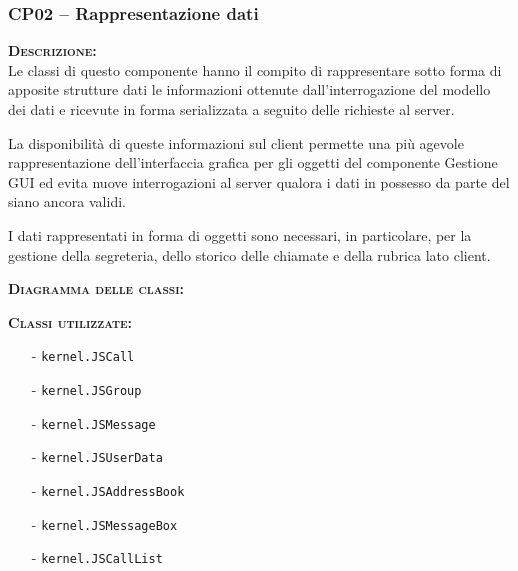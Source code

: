 \subsubsection{CP02 -- Rappresentazione dati}
\begin{description}
  \item{\scshape\bfseries Descrizione:}\\
Le classi di questo componente hanno il compito di rappresentare sotto forma di apposite strutture dati le informazioni ottenute dall'interrogazione del modello dei dati e ricevute in forma serializzata a seguito delle richieste al server.

La disponibilità di queste informazioni sul client permette una più agevole rappresentazione dell'interfaccia grafica per gli oggetti del componente \textsf{Gestione GUI} ed evita nuove interrogazioni al server qualora i dati in possesso da parte del  siano ancora validi.

I dati rappresentati in forma di oggetti sono necessari, in particolare, per la gestione della segreteria, dello storico delle chiamate e della rubrica lato client.

  \item{\scshape\bfseries Diagramma delle classi:}\\

	\item{\scshape\bfseries Classi utilizzate:} 
	\begin{itemize}[noitemsep,nolistsep]
		\item[-] \texttt{kernel.JSCall}
		\item[-] \texttt{kernel.JSGroup}
		\item[-] \texttt{kernel.JSMessage}
		\item[-] \texttt{kernel.JSUserData}
		\item[-] \texttt{kernel.JSAddressBook}
		\item[-] \texttt{kernel.JSMessageBox}
    \item[-] \texttt{kernel.JSCallList}
	\end{itemize}  
\end{description}

